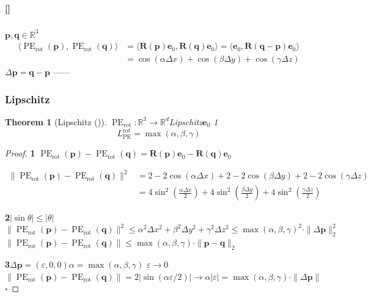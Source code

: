 \documentclass[11pt,a4paper]{article}
\newtheorem{theorem}{Theorem}[section]
\theoremstyle{remark}
\DeclareMathOperator{\PE}{PE}
\newcommand{\R}{\mathbb{R}}
\newcommand{\rigorous}{\textnormal{\textbf{[]}}}
\begin{document}
\rigorous{} \textbf{}

\subsubsection{}

$\mathbf{p}, \mathbf{q} \in \R^3$
\begin{align}
    \langle \PE_{\text{rot}}(\mathbf{p}), \PE_{\text{rot}}(\mathbf{q}) \rangle
    &= \langle \mathbf{R}(\mathbf{p})\mathbf{e}_0, \mathbf{R}(\mathbf{q})\mathbf{e}_0 \rangle
     = \langle \mathbf{e}_0, \mathbf{R}(\mathbf{q} - \mathbf{p})\mathbf{e}_0 \rangle \nonumber\\
    &= \cos(\alpha\Delta x) + \cos(\beta\Delta y) + \cos(\gamma\Delta z)
\end{align}
$\Delta\mathbf{p} = \mathbf{q} - \mathbf{p}$\textbf{}
——


\subsubsection{Lipschitz}

\begin{theorem}[Lipschitz ()]
\label{thm:1.3.1}
$\PE_{\text{rot}}: \R^3 \to \R^d$Lipschitz$\mathbf{e}_0$
1
\begin{equation}
    \boxed{
    L_{\PE}^{\text{rot}} = \max(\alpha, \beta, \gamma)
    }
\end{equation}
\end{theorem}

\begin{proof}
\textbf{1}
$\PE_{\text{rot}}(\mathbf{p}) - \PE_{\text{rot}}(\mathbf{q})
 = \mathbf{R}(\mathbf{p})\mathbf{e}_0 - \mathbf{R}(\mathbf{q})\mathbf{e}_0$

\begin{align}
    \|\PE_{\text{rot}}(\mathbf{p}) - \PE_{\text{rot}}(\mathbf{q})\|^2
    &= 2 - 2\cos(\alpha\Delta x) + 2 - 2\cos(\beta\Delta y) + 2 - 2\cos(\gamma\Delta z) \nonumber\\
    &= 4\sin^2\!\left(\frac{\alpha\Delta x}{2}\right)
     + 4\sin^2\!\left(\frac{\beta\Delta y}{2}\right)
     + 4\sin^2\!\left(\frac{\gamma\Delta z}{2}\right)
\end{align}

\textbf{2$|\sin\theta| \leq |\theta|$}
\begin{equation}
    \|\PE_{\text{rot}}(\mathbf{p}) - \PE_{\text{rot}}(\mathbf{q})\|^2
    \leq \alpha^2\Delta x^2 + \beta^2\Delta y^2 + \gamma^2\Delta z^2
    \leq \max(\alpha, \beta, \gamma)^2 \cdot \|\Delta\mathbf{p}\|_2^2
\end{equation}
$\|\PE_{\text{rot}}(\mathbf{p}) - \PE_{\text{rot}}(\mathbf{q})\|
 \leq \max(\alpha, \beta, \gamma) \cdot \|\mathbf{p} - \mathbf{q}\|_2$

\textbf{3}$\Delta\mathbf{p} = (\varepsilon, 0, 0)$$\alpha = \max(\alpha, \beta, \gamma)$
$\varepsilon \to 0$$\|\PE_{\text{rot}}(\mathbf{p}) - \PE_{\text{rot}}(\mathbf{q})\|
= 2|\sin(\alpha\varepsilon/2)| \to \alpha|\varepsilon|
= \max(\alpha, \beta, \gamma) \cdot \|\Delta\mathbf{p}\|$\hfill $\square$
\end{proof}
\end{document}

